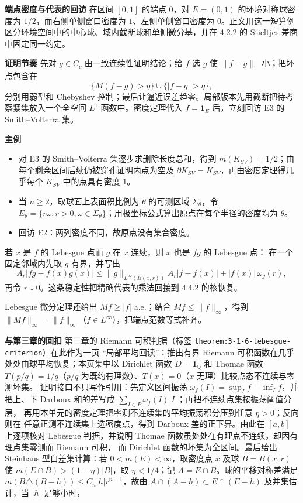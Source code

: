 \documentclass[11pt,a4paper]{ctexart}
\newcommand{\planitem}[1]{\par\smallskip\noindent\textcolor{deepblue}{\textbf{#1}}\quad}
\begin{document}
\planitem{端点密度与代表的回访}
在区间 $[0,1]$ 的端点 $0$，对 $E=(0,1)$ 的环境对称球密度为 $1/2$，而右侧单侧窗口密度为 $1$、左侧单侧窗口密度为 $0$。正文用这一短算例区分环境空间中的中心球、域内截断球和单侧微分基，并在 4.2.2 的 Stieltjes 差商中固定同一约定。

\planitem{证明节奏}
先对 $g\in C_c$ 由一致连续性证明结论；给 $f$ 选 $g$ 使 $\|f-g\|_1$ 小；把坏点包含在
\[
\{M(f-g)>\eta\}\cup\{|f-g|>\eta\},
\]
分别用弱型和 Chebyshev 控制；最后让逼近误差趋零。局部版本先用截断把待考察紧集放入一个全空间 $L^1$ 函数中。密度定理代入 $f=\mathbf1_E$ 后，立刻回访 E3 的 Smith--Volterra 集。

\planitem{主例}
\begin{itemize}
\item 对 E3 的 Smith--Volterra 集逐步求删除长度总和，得到 $m(K_{SV})=1/2$；由每个剩余区间后续仍被穿孔证明内点为空及 $\partial K_{SV}=K_{SV}$，再由密度定理得几乎每个 $K_{SV}$ 中的点具有密度 $1$。
\item 当 $n\ge2$，取球面上表面积比例为 $\theta$ 的可测区域 $\Sigma_\theta$，令 $E_\theta=\{r\omega:r>0,\omega\in\Sigma_\theta\}$；用极坐标公式算出原点在每个半径的密度均为 $\theta$。
\item 回访 E2：两列密度不同，故原点没有集合密度。
\end{itemize}

若 $x$ 是 $f$ 的 Lebesgue 点而 $g$ 在 $x$ 连续，则 $x$ 也是 $fg$ 的 Lebesgue 点：
在一个固定邻域内先取 $g$ 有界，并写出
\[
A_r|fg-f(x)g(x)|
\le \|g\|_{L^\infty(B(x,r))}A_r|f-f(x)|+|f(x)|\,\omega_g(r),
\]
再令 $r\downarrow0$。这条稳定性把精确代表的乘法回接到 4.4.2 的核恢复。

Lebesgue 微分定理还给出 $Mf\ge|f|$ a.e.；结合 $Mf\le\|f\|_\infty$，得到
$\|Mf\|_\infty=\|f\|_\infty$（$f\in L^\infty$），把端点范数等式补齐。

\planitem{与第三章的回扣}
第三章的 Riemann 可积判据（标签 \texttt{theorem:3-1-6-lebesgue-criterion}）在此作为一页
“局部平均回读”：推出有界 Riemann 可积函数在几乎处处由球平均恢复；本页集中以
Dirichlet 函数 $D=\mathbf1_{\mathbb Q}$ 和 Thomae 函数
$T(p/q)=1/q$（$p/q$ 为既约有理数）、$T(x)=0$（$x$ 无理）比较点态不连续与零测坏集。
证明接口不只写作引用：先定义区间振荡
$\omega_f(I)=\sup_I f-\inf_I f$，并把上、下 Darboux 和的差写成
$\sum_{I\in P}\omega_f(I)|I|$；再把不连续点集按振荡阈值分层，
再用本单元的密度定理把零测不连续集的平均振荡积分压到任意 $\eta>0$；反向则在
任意正测不连续集上选密度点，得到 Darboux 差的正下界。由此在 $[a,b]$ 上逐项核对
Lebesgue 判据，并说明 Thomae 函数虽处处在有理点不连续，却因有理点集零测而 Riemann 可积，
而 Dirichlet 函数的坏集为全区间。最后给出 Steinhaus 型自差集计算：若
$0<m(E)<\infty$，取密度点 $x$ 及球 $B=B(x,r)$ 使
$m(E\cap B)>(1-\eta)|B|$，取 $\eta<1/4$；记 $A=E\cap B$。球的平移对称差满足
$m(B\triangle(B-h))\le C_n|h|r^{n-1}$，故由
$A\cap(A-h)\subset E\cap(E-h)$ 及并集估计，当 $|h|$ 足够小时，
\end{document}
